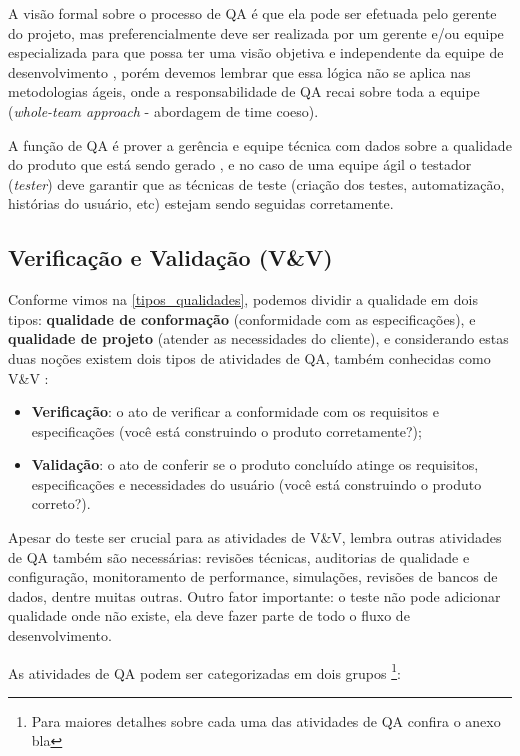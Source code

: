 \documentclass[
	12pt,				%
	openright,			%
	oneside,			%
	a4paper,			%
	english,			%
	brazil,				%
	]{abntex2}
\begin{document}
A visão formal sobre o processo de QA é que ela pode ser efetuada pelo gerente do projeto, mas preferencialmente deve ser realizada por um gerente e/ou equipe especializada para que possa ter uma visão objetiva e independente da equipe de desenvolvimento \cite{SOMMERVILLE2011,WAZLAWICK2013}, porém devemos lembrar que essa lógica não se aplica nas metodologias ágeis, onde a responsabilidade de QA recai sobre toda a equipe (\emph{whole-team approach} - abordagem de time coeso).

A função de QA é prover a gerência e equipe técnica com dados sobre a qualidade do produto que está sendo gerado \cite{SOMMERVILLE2011}, e no caso de uma equipe ágil o testador (\emph{tester}) deve garantir que as técnicas de teste (criação dos testes, automatização, histórias do usuário, etc) estejam sendo seguidas corretamente.

\subsection{Verificação e Validação (V\&V)}
Conforme vimos na \autoref{tipos_qualidades}, podemos dividir a qualidade em dois tipos: \textbf{qualidade de conformação} (conformidade com as especificações), e \textbf{qualidade de projeto} (atender as necessidades do cliente), e considerando estas duas noções existem dois tipos de atividades de QA, também conhecidas como V\&V \cite{tsui2013, PRESSMAN2010}:
\begin{itemize}
    \item \textbf{Verificação}: o ato de verificar a conformidade com os requisitos e especificações (você está construindo o produto corretamente?);
    \item \textbf{Validação}: o ato de conferir se o produto concluído atinge os requisitos, especificações e necessidades do usuário (você está construindo o produto correto?).
\end{itemize}

Apesar do teste ser crucial para as atividades de V\&V,  lembra outras atividades de QA também são necessárias: revisões técnicas, auditorias de qualidade e configuração, monitoramento de performance, simulações, revisões de bancos de dados, dentre muitas outras. Outro fator importante: o teste não pode adicionar qualidade onde não existe, ela deve fazer parte de todo o fluxo de desenvolvimento.

As atividades de QA podem ser categorizadas em dois grupos \cite{Huo:2004:SQA:1025117.1025549,Naik2011}\footnote{Para maiores detalhes sobre cada uma das atividades de QA confira o anexo bla}: %
\end{document}
